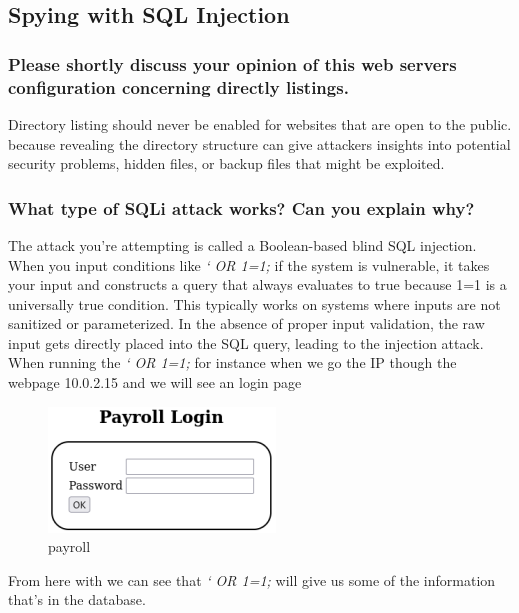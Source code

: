 \subsection{Spying with SQL Injection}

\subsubsection{Please shortly discuss your opinion of this web servers configuration concerning directly listings.}
Directory listing should never  be enabled for websites that are open to the public. because revealing the
directory structure can give attackers insights into potential security problems, hidden files, or
backup files that might be exploited.


\subsubsection{What type of SQLi attack works? Can you explain why?}
The attack you're attempting is called a Boolean-based blind SQL injection. When you input
conditions like \textit{‘ OR 1=1;} if the system is vulnerable, it takes your input and constructs a
query that always evaluates to true because 1=1 is a universally true condition. This typically
works on systems where inputs are not sanitized or parameterized. In the absence of proper
input validation, the raw input gets directly placed into the SQL query, leading to the injection
attack.
When running the \textit{‘ OR 1=1;} for instance when we go the IP though the webpage
10.0.2.15 and we will see an login page

\begin{figure}[H]
      \centering
      \includegraphics[width=0.3\linewidth]{pic/payroll.png}
      \caption{payroll}
      \label{fig:payroll}
\end{figure}

From here with we can see that \textit{‘ OR 1=1;} will give us some of the information that's in the
database.

